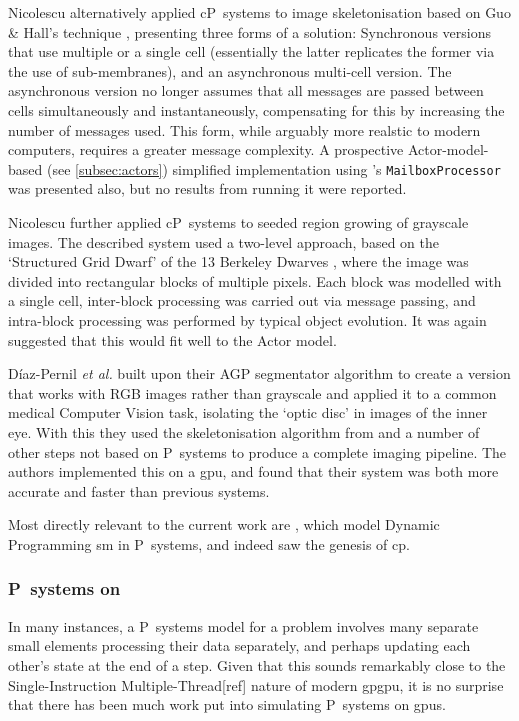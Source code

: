 Nicolescu \cite{Nicolescu2014} alternatively applied cP~systems to image skeletonisation based on Guo \& Hall's technique \cite{Guo1989}, presenting three forms of a solution: Synchronous versions that use multiple or a single cell (essentially the latter replicates the former via the use of sub-membranes), and an asynchronous multi-cell version.  The asynchronous version no longer assumes that all messages are passed between cells simultaneously and instantaneously, compensating for this by increasing the number of messages used.  This form, while arguably more realstic to modern computers, requires a greater message complexity. A prospective Actor-model-based (see \autoref{subsec:actors}) simplified implementation using \fsharp{}'s \texttt{MailboxProcessor} \cite[ch.~11]{Syme2015a} was presented also, but no results from running it were reported.

Nicolescu \cite{Nicolescu2015a} further applied cP~systems to seeded region growing of grayscale images.  The described system used a two-level approach, based on the `Structured Grid Dwarf' of the 13 Berkeley Dwarves \cite{Asanovic2006}, where the image was divided into rectangular blocks of multiple pixels.  Each block was modelled with a single cell, inter-block processing was carried out via message passing, and intra-block processing was performed by typical object evolution.  It was again suggested that this would fit well to the Actor model.

Díaz-Pernil \textit{et al.} \cite{Diaz-Pernil2016} built upon their AGP segmentator algorithm to create a version that works with RGB images rather than grayscale and applied it to a common medical Computer Vision task, isolating the `optic disc' in images of the inner eye.  With this they used the skeletonisation algorithm from \cite{Diaz-Pernil2013a} and a number of other steps not based on P~systems to produce a complete imaging pipeline.  The authors implemented this on a \gls{gpu}, and found that their system was both more accurate and faster than previous systems.

Most directly relevant to the current work are \cite{GimelFarb2013a,Gimelfarb2011,Nicolescu2014b}, which model Dynamic Programming \gls{sm} in P~systems, and indeed saw the genesis of \gls{cp}.  

\subsubsection{P~systems on }
In many instances, a P~systems model for a problem involves many separate small elements processing their data separately, and perhaps updating each other's state at the end of a step.  Given that this sounds remarkably close to the Single-Instruction Multiple-Thread[ref] nature of modern \gls{gpgpu}, it is no surprise that there has been much work put into simulating P~systems on \glspl{gpu}.

